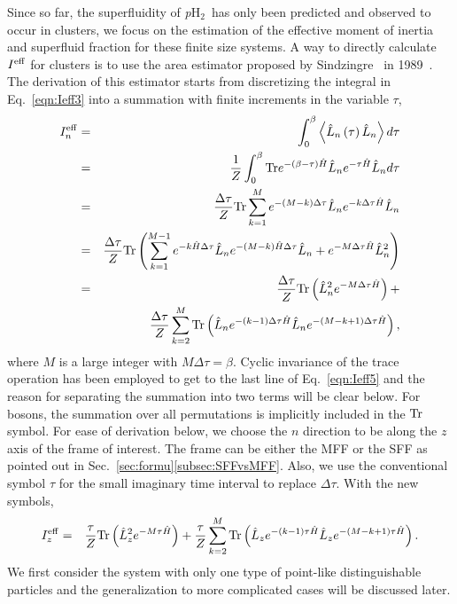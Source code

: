 \documentclass[12pt]{iopart}
\newcommand{\phtwo}{{\em p}H$_2$}
\begin{document}
Since so far, the superfluidity of \phtwo~has only been predicted and observed to occur in clusters, 
we focus on the estimation of the effective moment of inertia and superfluid fraction for these finite size systems. 
A way to directly calculate $I^{\rm eff}$ for clusters is to use the area estimator proposed by Sindzingre \etal~in 1989~\cite{ceperley_area_estim}. 
The derivation of this estimator starts from discretizing the integral in Eq.~\ref{eqn:Ieff3} into a summation with finite increments in the variable $\tau$,
\begin{eqnarray}
I^{\rm eff}_n&=&\int_0^\beta \left< \hat{L}_n\left( \tau \right) \hat{L}_n \right> d\tau \nonumber\\
&=&\frac{1}{Z}\int_0^\beta {\rm Tr} e^{ -\left(\beta-\tau \right)\hat{H} }\hat{L}_n e^{ -\tau\hat{H} }\hat{L}_n d\tau \nonumber\\
&=&\frac{\Delta \tau}{Z}{\rm Tr} \sum_{k=1}^M  e^{ -\left(M-k \right)\Delta \tau }\hat{L}_n e^{ -k\Delta\tau\hat{H} }\hat{L}_n \nonumber\\
&=&\frac{\Delta \tau}{Z}{\rm Tr} \left(\sum_{k=1}^{M-1} e^{ -k\hat{H}\Delta \tau}\hat{L}_n e^{ -\left( M-k\right)\hat{H}\Delta \tau }\hat{L}_n +e^{ -M\Delta\tau\hat{H} }\hat{L}_n^2 \right) \nonumber\\
&=&\frac{\Delta \tau}{Z}{\rm Tr}\left(\hat{L}_n^2  e^{ -M\Delta\tau\hat{H} } \right) + \nonumber\\
&&\frac{\Delta\tau}{Z}\sum_{k=2}^M {\rm Tr} \left( \hat{L}_n e^{-\left( k-1 \right)\Delta\tau\hat{H} } \hat{L}_n e^{ -\left( M-k+1 \right)\Delta\tau\hat{H} } \right), \label{eqn:Ieff5}
\end{eqnarray}
where $M$ is a large integer with $M\Delta\tau=\beta$. Cyclic invariance of the trace operation has been employed to get to the last line of Eq.~\ref{eqn:Ieff5} and the reason for separating the summation into two terms will be clear below. 
For bosons, the summation over all  permutations is implicitly included in the ${\rm Tr}$ symbol. 
For ease of derivation below, we choose the $n$ direction to be along the $z$ axis of the frame of interest. 
The frame can be either the MFF or the SFF as pointed out in Sec.~\ref{sec:formu}\ref{subsec:SFFvsMFF}. 
Also, we use the conventional symbol $\tau$ for the small imaginary time interval to replace $\Delta\tau$. 
With the new symbols,
\begin{eqnarray}
I^{\rm eff}_z&=&\frac{\tau}{Z}{\rm Tr}\left(\hat{L}_z^2 e^{  -M\tau\hat{H} } \right) + \frac{\tau}{Z}\sum_{k=2}^M {\rm Tr} \left( \hat{L}_z e^{  -\left( k-1 \right)\tau\hat{H} } \hat{L}_z e^{ -\left( M-k+1 \right)\tau\hat{H} } \right). \label{eqn:Ieff6}
\end{eqnarray}
We first consider the system with only one type of point-like distinguishable particles and the generalization to more complicated cases will be discussed later.
\end{document}
